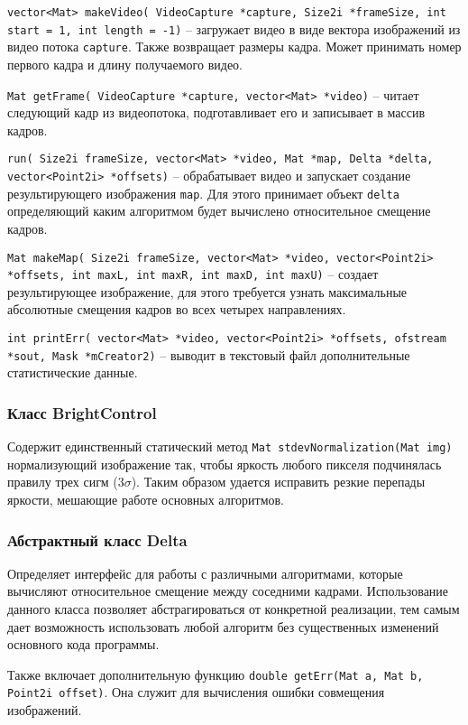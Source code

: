 \texttt{vector<Mat> makeVideo( VideoCapture *capture, Size2i *frameSize, int start = 1, int length = -1)} -- загружает видео в виде вектора изображений из видео потока \texttt{capture}. Также возвращает размеры кадра. Может принимать номер первого кадра и длину получаемого видео. 

\texttt{Mat getFrame( VideoCapture *capture, vector<Mat> *video)} -- читает следующий кадр из видеопотока, подготавливает его и записывает в массив кадров.

\texttt{run( Size2i frameSize, vector<Mat> *video, Mat *map, Delta *delta,
    vector<Point2i> *offsets)} -- обрабатывает видео и запускает создание результирующего изображения \texttt{map}. Для этого принимает объект \texttt{delta} определяющий каким алгоритмом будет вычислено относительное смещение кадров.

\texttt{Mat makeMap( Size2i frameSize, vector<Mat> *video, vector<Point2i> *offsets,
    int maxL, int maxR, int maxD, int maxU)} -- создает результирующее изображение, для этого требуется узнать максимальные абсолютные смещения кадров во всех четырех направлениях.

\texttt{int printErr( vector<Mat> *video, vector<Point2i> *offsets, ofstream *sout, Mask *mCreator2)} -- выводит в текстовый файл дополнительные статистические данные.

\subsubsection{Класс BrightControl~}
Содержит единственный статический метод \texttt{Mat stdevNormalization(Mat img)} нормализующий изображение так, чтобы яркость любого пикселя подчинялась правилу трех сигм ($3\sigma$). Таким образом удается исправить резкие перепады яркости, мешающие работе основных алгоритмов. 
\subsubsection{Абстрактный класс Delta~}
Определяет интерфейс для работы с различными алгоритмами, которые вычисляют относительное смещение между соседними кадрами. Использование данного класса позволяет абстрагироваться от конкретной реализации, тем самым дает возможность использовать любой алгоритм без существенных изменений основного кода программы. 

Также включает дополнительную функцию \texttt{double getErr(Mat a, Mat b, Point2i offset)}. Она служит для вычисления ошибки совмещения изображений.
